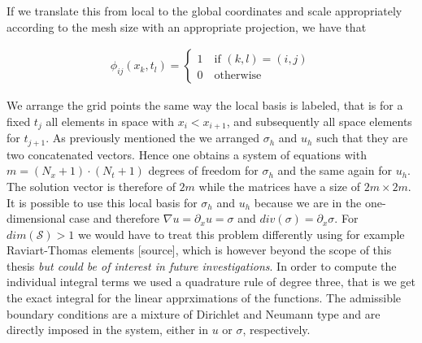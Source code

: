 \documentclass[../draft_1.tex]{subfiles}
\begin{document}
If we translate this from local to the global coordinates and scale appropriately according to the mesh size with an appropriate projection, we have that 
\begin{ceqn}
	\begin{equation}
	\begin{aligned}
	\phi_{ij}(x_k, t_l) = \begin{cases} 1 \quad \text{if } (k,l) = (i,j)  \\ 0 \quad \text{otherwise} \end{cases}
	\end{aligned}
	\end{equation}
	\end{ceqn}

We arrange the grid points the same way the local basis is labeled, that is for a fixed $t_j$ all elements in space with $x_i < x_{i+1}$, and subsequently all space elements for $t_{j+1}$. As previously mentioned the we arranged $\sigma_h$ and $u_h$ such that they are two concatenated vectors. Hence one obtains a system of equations with $m = (N_x + 1 )\cdot (N_t + 1)$ degrees of freedom for $\sigma_h$ and the same again for $u_h$. The solution vector is therefore of $2m$ while the matrices have a size of $2m \times 2m$. It is possible to use this local basis for $\sigma_h$ and $u_h$ because we are in the one-dimensional case and therefore $ \nabla u = \partial_x u = \sigma$ and $div(\sigma) = \partial_{x} \sigma$. For $dim (\mathcal{S}) > 1 $ we would have to treat this problem differently using for example Raviart-Thomas elements [source], which is however beyond the scope of this thesis \textit{but could be of interest in future investigations}. In order to compute the individual integral terms we used a quadrature rule of degree three, that is we get the exact integral for the linear apprximations of the functions. The admissible boundary conditions are a mixture of Dirichlet and Neumann type and are directly imposed in the system, either in $u$ or $\sigma$, respectively. 
\end{document}
